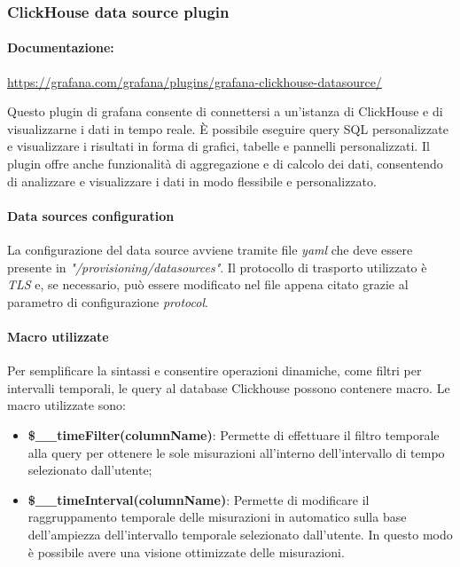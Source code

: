 \subsubsection{ClickHouse data source plugin} \label{sec:click_plugin}
\paragraph{Documentazione:}
\href{https://grafana.com/grafana/plugins/grafana-clickhouse-datasource/}{https://grafana.com/grafana/plugins/grafana-clickhouse-datasource/}

Questo plugin di grafana consente di connettersi a un'istanza di ClickHouse e di visualizzarne i dati in tempo reale. È possibile eseguire query SQL personalizzate e visualizzare i risultati in forma di grafici, tabelle e pannelli personalizzati. Il plugin offre anche funzionalità di aggregazione e di calcolo dei dati, consentendo di analizzare e visualizzare i dati in modo flessibile e personalizzato.

\paragraph{Data sources configuration}
La configurazione del data source avviene tramite file \textit{yaml} che deve essere presente in \textit{"/provisioning/datasources"}.
Il protocollo di trasporto utilizzato è \textit{TLS} e, se necessario, può essere modificato nel file appena citato grazie al parametro di configurazione \textit{protocol}.

\paragraph{Macro utilizzate}\label{sec:macros}
Per semplificare la sintassi e consentire operazioni dinamiche, come filtri per intervalli temporali, le query al database Clickhouse possono contenere macro.
Le macro utilizzate sono:
\begin{itemize}
    \item \textbf{\$\_\_timeFilter(columnName)}: Permette di effettuare il filtro temporale alla query per ottenere le sole misurazioni all'interno dell'intervallo di tempo selezionato dall'utente;
    \item  \textbf{\$\_\_timeInterval(columnName)}: Permette di modificare il raggruppamento temporale delle misurazioni in automatico sulla base dell'ampiezza dell'intervallo temporale selezionato dall'utente.
    In questo modo è possibile avere una visione ottimizzate delle misurazioni.
\end{itemize}

